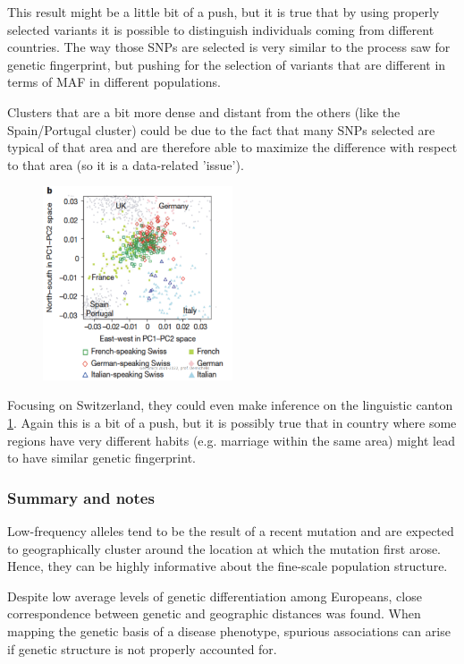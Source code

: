 This result might be a little bit of a push, but it is true that by using properly selected variants it is possible to distinguish individuals coming from different countries. The way those SNPs are selected is very similar to the process saw for genetic fingerprint, but pushing for the selection of variants that are different in terms of MAF in different populations.

Clusters that are a bit more dense and distant from the others (like the Spain/Portugal cluster) could be due to the fact that many SNPs selected are typical of that area and are therefore able to maximize the difference with respect to that area (so it is a data-related 'issue').

\begin{figure}[H]
	\centering
	\includegraphics[width=0.5\textwidth]{swiss.PNG}
	\caption{\label{fig: PCA_swiss}}
\end{figure}

Focusing on Switzerland, they could even make inference on the linguistic canton \ref{fig: PCA_swiss}. Again this is a bit of a push, but it is possibly true that in country where some regions have very different habits (e.g. marriage within the same area) might lead to have similar genetic fingerprint.


\subsubsection{Summary and notes}
Low-frequency alleles tend to be the result of a recent mutation and are expected to geographically cluster around the location at which the mutation first arose. Hence, they can be highly informative about the fine-scale population structure.

Despite low average levels of genetic differentiation among Europeans, close correspondence between genetic and geographic distances was
found. When mapping the genetic basis of a disease phenotype, spurious
associations can arise if genetic structure is not properly accounted for.

